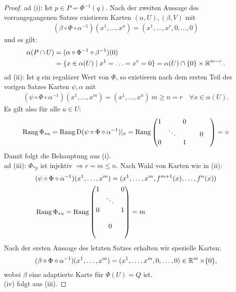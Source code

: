 \begin{proof}
  ad (i): Ist $p \in P = \Phi^{-1}(q)$. Nach der zweiten Aussage des vorrangegangenen Satzes existieren Karten $(\alpha,U), (\beta, V)$ mit 
  \begin{align*}
    (\beta \circ \Phi \circ \alpha^{-1})(x^1,\ldots,x^n) = (x^1, \ldots,x^r, 0, \ldots, 0)
  \end{align*}
  und es gilt:
  \begin{align*}
    \alpha(P \cap U) & = (\alpha \circ \Phi^{-1} \circ \beta^{-1})(0) \\
    & = \{x \in \alpha (U) \mid x^1 = \ldots = x^r = 0\} = \alpha(U) \cap \{0\} \times \operatorname{\mathbb{R}}^{m-r}.
  \end{align*} 
  ad (ii): Ist $q$ ein regulärer Wert von $\Phi$, so existieren nach dem ersten Teil des vorigen Satzes Karten $\psi,\alpha$ mit 
  \begin{align*}
    (\psi \circ \Phi \circ \alpha^{-1})(x^1, \ldots, x^m) = (x^1, \ldots, x^n) \ m \geq n = r \quad \forall x \in \alpha(U).
  \end{align*}
  Es gilt also für alle $u \in U$:
  \begin{align*}
    \operatorname{Rang} \Phi_{*u} = \operatorname{Rang} \operatorname{D}(\psi \circ \Phi \circ \alpha^{-1})|_x = \operatorname{Rang}
    \begin{pmatrix}
      1 &        & 0 &  &   & \\
      & \ddots &   &  & 0 & \\
      0 &        & 1 &  &   &
    \end{pmatrix}
    = \textcolor{red}{n}
  \end{align*}
  Damit folgt die Behauptung aus (i).\\
  ad (iii): $\Phi_{*p}$ ist injektiv $\Rightarrow r = m \leq n$. Nach Wahl von Karten wie in (ii):
  \begin{align*}
    & (\psi \circ \Phi \circ \alpha^{-1})(x^1, \ldots, x^m) = (x^1, \ldots, x^m,f^{m+1}(x), \ldots, f^n(x))\\
    & \Rang \Phi_{*u} = \Rang 
    \begin{pmatrix}
      1 &        & 0\\
        & \ddots &  \\
      0 &        & 1\\
        &        &  \\
        & 0      &  \\
        &        &  
    \end{pmatrix}
    = m %
  \end{align*}
  Nach der ersten Aussage des letzten Satzes erhalten wir spezielle Karten:
  \begin{align*}
    (\beta \circ \Phi \circ \alpha^{-1})(x^1, \ldots, x^m) = (x^1, \ldots, x^m, 0, \ldots, 0) \in \operatorname{\mathbb{R}}^{m} \times \{0\},
  \end{align*}
  wobei $\beta$ eine adaptierte Karte für $\Phi(U) = Q$ ist.\\
  (iv) folgt aus (iii).
\end{proof}

